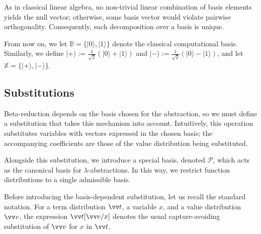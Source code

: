 \documentclass[runningheads,orivec,envcountsame,envcountsect]{llncs}
\providecommand{\qed}{\hbox{\rule{1ex}{1ex}}}%
\newcommand\ket[1]{\ensuremath{|#1\rangle}}
\newcommand\AbsBasis{\ensuremath{\mathcal{P}}}
\newcommand\B{\mathbb B}
\newcommand\XB{\mathbb X}
\begin{document}
As in classical linear algebra, no non-trivial linear combination of basis
elements yields the null vector; otherwise, some basis vector would violate
pairwise orthogonality. Consequently, each decomposition over a basis is
unique.



From now on, we let $\B=\{\ket{0},\ket{1}\}$ denote the classical computational
basis. Similarly, we define
$\ket{+}:=\frac 1{\sqrt{2}}(\ket{0}+\ket{1})$ and
$\ket{-}:=\frac 1{\sqrt{2}}(\ket{0}-\ket{1})$, and let
$\XB=\{\ket{+},\ket{-}\}$.

\subsection{Substitutions}
Beta-reduction depends on the basis chosen for the abstraction, so we must
define a substitution that takes this mechanism into account. Intuitively, this
operation substitutes variables with vectors expressed in the chosen basis; the
accompanying coefficients are those of the value distribution being
substituted.

Alongside this substitution, we introduce a special basis, denoted
$\AbsBasis$, which acts as the canonical basis for $\lambda$-abstractions. In
this way, we restrict function distributions to a single admissible basis.

Before introducing the basis-dependent substitution, let us recall the
standard notation. For a term distribution $\vv t$, a variable $x$, and a
value distribution $\vv v$, the expression $\vv t[\vv v/x]$ denotes the
usual capture-avoiding substitution of $\vv v$ for $x$ in $\vv t$.
\end{document}
